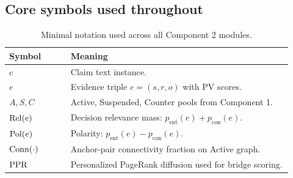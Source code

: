 \subsection{Core symbols used throughout}
\begin{table}[H]
\centering
\begin{tabular}{@{}p{0.2\linewidth}p{0.72\linewidth}@{}}
\toprule
Symbol & Meaning \\
\midrule
$c$ & Claim text instance. \\
$e$ & Evidence triple $e=(s,r,o)$ with PV scores. \\
$A,S,C$ & Active, Suspended, Counter pools from Component 1. \\
$\operatorname{Rel}(e)$ & Decision relevance mass: $p_{\text{ent}}(e)+p_{\text{con}}(e)$. \\
$\operatorname{Pol}(e)$ & Polarity: $p_{\text{ent}}(e)-p_{\text{con}}(e)$. \\
$\operatorname{Conn}(\cdot)$ & Anchor-pair connectivity fraction on Active graph. \\
$\operatorname{PPR}$ & Personalized PageRank diffusion used for bridge scoring. \\
\bottomrule
\end{tabular}
\caption{Minimal notation used across all Component 2 modules.}
\label{tab:core-notation}
\end{table}
